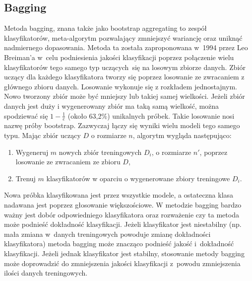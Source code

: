 \subsection{Bagging}
Metoda bagging, znana także jako bootstrap aggregating to zespół klasyfikatorów, meta-algorytm pozwalający zmniejszyć wariancję oraz uniknąć nadmiernego dopasowania. Metoda ta została zaproponowana w 1994 przez Leo Breiman’a w celu podniesienia jakości klasyfikacji poprzez połączenie wielu klasyfikatorów tego samego typ uczących się na losowym zbiorze danych. Zbiór uczący dla każdego klasyfikatora tworzy się poprzez losowanie ze zwracaniem z głównego zbioru danych. Losowanie wykonuje się z rozkładem jednostajnym. Nowo tworzony zbiór może być mniejszy lub takiej samej wielkości. Jeżeli zbiór danych jest duży i wygenerowany zbiór ma taką samą wielkość, można spodziewać się $1-\frac{1}{e}$ (około 63,2\%) unikalnych próbek. Takie losowanie nosi nazwę próby bootstrap. Zazwyczaj łączy się wyniki wielu modeli tego samego typu. Mając zbiór uczący $D$ o rozmiarze $n$, algorytm wygląda następująco:
\begin{enumerate}
	\item Wygeneruj $m$ nowych zbiór treningowych $D_i$, o rozmiarze $n'$, poprzez losowanie ze zwracaniem ze zbioru $D$,
	\item Trenuj $m$ klasyfikatorów w oparciu o wygenerowane zbiory treningowe $D_i$.	
\end{enumerate}
Nowa próbka klasyfikowana jest przez wszystkie modele, a ostateczna klasa nadawana jest poprzez głosowanie większościowe.
W metodzie bagging bardzo ważny jest dobór odpowiedniego klasyfikatora oraz rozważenie czy ta metoda może podnieść dokładność klasyfikacji. Jeżeli klasyfikator jest niestabilny (np. mała zmiana w danych treningowych powoduje zmianę dokładności klasyfikatora) metoda bagging może znacząco podnieść jakość i dokładność klasyfikacji. Jeżeli jednak klasyfikator jest stabilny, stosowanie metody bagging może doprowadzić do zmniejszenia jakości klasyfikacji z powodu zmniejszenia ilości danych treningowych.
